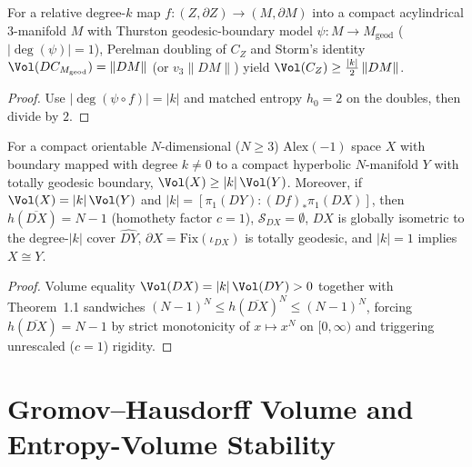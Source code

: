 \begin{theorem}
\label{thm_simplicial_volume}
\leanok
{}
For a relative degree-$k$ map $f : (Z, \partial Z) \to (M, \partial M)$ into a compact acylindrical
$3$-manifold $M$ with Thurston geodesic-boundary model $\psi : M \to M_{\mathrm{geod}}$
($|\deg(\psi)| = 1$), Perelman doubling of $C_Z$ and Storm's identity $\Vol(DC_{M_{\mathrm{geod}}}) = \|DM\|$
(or $v_3 \|DM\|$) yield $\Vol(C_Z) \ge \frac{|k|}{2}\,\|DM\|$.
\end{theorem}
\begin{proof}\leanok
Use $|\deg(\psi \circ f)| = |k|$ and matched entropy $h_0 = 2$ on the doubles, then divide by $2$.
\end{proof}

\begin{theorem}
\label{thm_boundary_rigidity}
\leanok
{}
For a compact orientable $N$-dimensional ($N \ge 3$) $\mathrm{Alex}(-1)$ space $X$ with boundary
mapped with degree $k \neq 0$ to a compact hyperbolic $N$-manifold $Y$ with totally geodesic
boundary, $\Vol(X) \ge |k|\,\Vol(Y)$. Moreover, if $\Vol(X) = |k|\,\Vol(Y)$ and
$|k| = [\pi_1(DY) : (Df)_* \pi_1(DX)]$, then $h(\overline{DX}) = N - 1$ (homothety factor $c = 1$),
$\mathcal{S}_{DX} = \emptyset$, $DX$ is globally isometric to the degree-$|k|$ cover $\widehat{DY}$,
$\partial X = \mathrm{Fix}(\iota_{DX})$ is totally geodesic, and $|k| = 1$ implies $X \cong Y$.
\end{theorem}
\begin{proof}\leanok
Volume equality $\Vol(DX) = |k|\,\Vol(DY) > 0$ together with Theorem~1.1 sandwiches
$(N-1)^N \le h(\overline{DX})^N \le (N-1)^N$, forcing $h(\overline{DX}) = N - 1$ by strict
monotonicity of $x \mapsto x^N$ on $[0, \infty)$ and triggering unrescaled ($c = 1$) rigidity.
\end{proof}

\chapter{Gromov--Hausdorff Volume and Entropy-Volume Stability}


